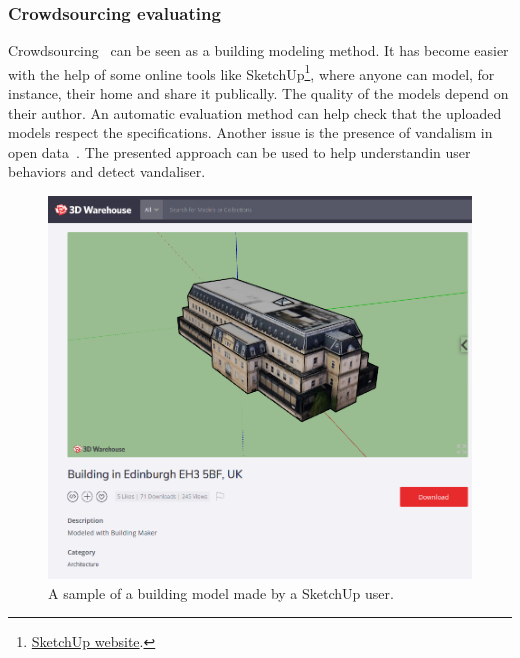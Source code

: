             \subsubsection{Crowdsourcing evaluating}
            Crowdsourcing~\parencite{kovashka2016crowdsourcing} can be seen as a building modeling method.
            It has become easier with the help of some online tools like SketchUp\footnote{
                \href{https://www.sketchup.com}{SketchUp website}.
            }, where anyone can model, for instance, their home and share it publically.
            The quality of the models depend on their author.
            An automatic evaluation method can help check that the uploaded models respect the specifications.
            Another issue is the presence of vandalism in open data~\parencite{neis2012towards}.
            The presented approach can be used to help understandin user behaviors and detect vandaliser.
            \begin{figure}[htpb]
                \centering
                \includegraphics[width=.7\textwidth]{images/introduction/use/crowdsourcing}
                \caption{
                    \label{fig::crowdsourcing}
                    A sample of a building model made by a SketchUp user.
                }
            \end{figure}


